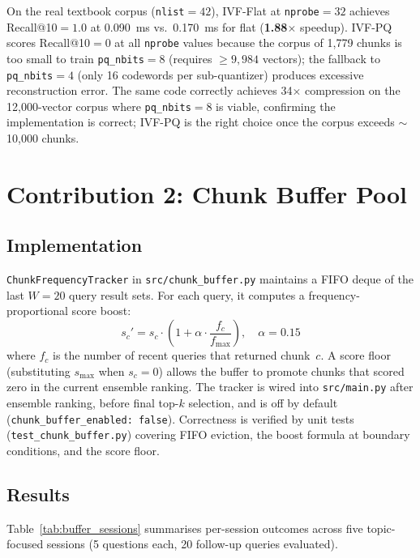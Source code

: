 \documentclass[11pt,letterpaper]{article}
\begin{document}
On the real textbook corpus (\texttt{nlist}$=42$), IVF-Flat at \texttt{nprobe}$=32$
achieves Recall@10$=1.0$ at 0.090~ms vs.\ 0.170~ms for flat (\textbf{1.88$\times$}
speedup).  IVF-PQ scores Recall@10$=0$ at all \texttt{nprobe} values because the
corpus of 1,779 chunks is too small to train \texttt{pq\_nbits}$=8$ (requires
$\geq\!9{,}984$ vectors); the fallback to \texttt{pq\_nbits}$=4$ (only 16 codewords
per sub-quantizer) produces excessive reconstruction error. The same code correctly
achieves 34$\times$ compression on the 12,000-vector corpus where \texttt{pq\_nbits}$=8$
is viable, confirming the implementation is correct; IVF-PQ is the right choice once
the corpus exceeds $\sim$10,000 chunks.

\section{Contribution 2: Chunk Buffer Pool}

\subsection{Implementation}

\texttt{ChunkFrequencyTracker} in \texttt{src/chunk\_buffer.py} maintains a FIFO
deque of the last $W{=}20$ query result sets.  For each query, it computes a
frequency-proportional score boost:
\begin{equation}
  s_c' = s_c \cdot \left(1 + \alpha \cdot \frac{f_c}{f_{\max}}\right), \quad \alpha = 0.15
  \label{eq:boost}
\end{equation}
where $f_c$ is the number of recent queries that returned chunk~$c$.  A score
floor (substituting $s_{\max}$ when $s_c{=}0$) allows the buffer to promote chunks
that scored zero in the current ensemble ranking.  The tracker is wired into
\texttt{src/main.py} after ensemble ranking, before final top-$k$ selection,
and is off by default (\texttt{chunk\_buffer\_enabled: false}).
Correctness is verified by unit tests (\texttt{test\_chunk\_buffer.py}) covering
FIFO eviction, the boost formula at boundary conditions, and the score floor.

\subsection{Results}

Table~\ref{tab:buffer_sessions} summarises per-session outcomes across five
topic-focused sessions (5 questions each, 20 follow-up queries evaluated).
\end{document}
